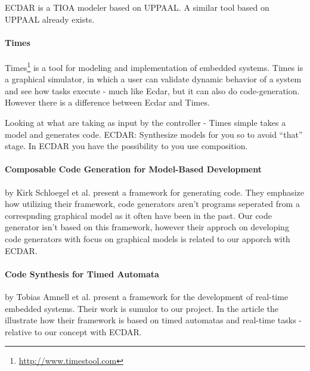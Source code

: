 ECDAR is a TIOA modeler based on UPPAAL. A similar tool based on UPPAAL already
exists.

\paragraph{Times}
Times\footnote{\url{http://www.timestool.com}} is a tool for modeling and
implementation of embedded systems. Times is a graphical simulator, in which a
user can validate dynamic behavior of a system and see how tasks execute - much
like Ecdar, but it can also do code-generation. However there is a difference
between Ecdar and Times.

Looking at what are taking as input by the controller - Times simple takes a
model and generates code. ECDAR: Synthesize models for you so to avoid “that”
stage. In ECDAR you have the possibility to you use composition.

\paragraph{Composable Code Generation for Model-Based Development}
by Kirk Schloegel et al. present a framework for generating
code\cite{composable-code-generation}. They emphasize how utilizing their
framework, code generators aren't programs seperated from a correspnding
graphical model as it often have been in the past. Our code generator isn't
based on this framework, however their approch on developing code generators
with focus on graphical models is related to our apporch with ECDAR.

\paragraph{Code Synthesis for Timed Automata}
by Tobias Amnell et al. present a framework for the development of real-time
embedded systems\cite{Amnell:2002:CST:779110.779112}. Their work is sumulor to
our project. In the article the illustrate how their framework is based on timed
automatas and real-time tasks - relative to our concept with ECDAR.
